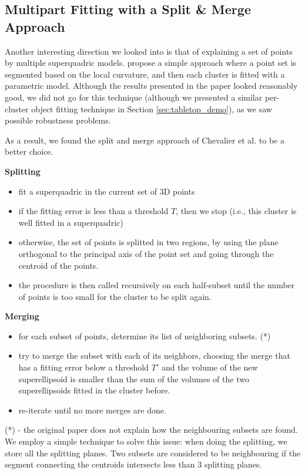 \documentclass{article}
\begin{document}
\subsection {Multipart Fitting with a Split \& Merge Approach}

Another interesting direction we looked into is that of explaining a set of points by multiple superquadric models. \cite{doi:10.1117/1.1762516} propose a simple approach where a point set is segmented based on the local curvature, and then each cluster is fitted with a parametric model. Although the results presented in the paper looked reasonably good, we did not go for this technique (although we presented a similar per-cluster object fitting technique in Section \ref{sec:tabletop_demo}), as we saw possible robustness problems.

As a result, we found the split and merge approach of Chevalier et al. \cite{conf/wscg/ChevalierJB03} to be a better choice.

\textbf{Splitting}
\begin{itemize}
	\item {fit a superquadric in the current set of 3D points}
	\item {if the fitting error is less than a threshold $T$, then we stop (i.e., this cluster is well fitted in a superquadric)}
	\item {otherwise, the set of points is splitted in two regions, by using the plane orthogonal to the principal axis of the point set and going through the centroid of the points.}
	\item {the procedure is then called recursively on each half-subset until the number of points is too small for the cluster to be split again.}
\end{itemize}

\textbf{Merging}
\begin{itemize}
	\item {for each subset of points, determine its list of neighboring subsets. (*)}
	\item {try to merge the subset with each of its neighbors, choosing the merge that has a fitting error below a threshold $T'$ and the volume of the new superellipsoid is smaller than the sum of the volumes of the two superellipsoids fitted in the cluster before.}
	\item {re-iterate until no more merges are done.}
\end{itemize}

(*) - the original paper does not explain how the neighbouring subsets are found. We employ a simple technique to solve this issue: when doing the splitting, we store all the splitting planes. Two subsets are considered to be neighbouring if the segment connecting the centroids intersects less than 3 splitting planes.
\end{document}
